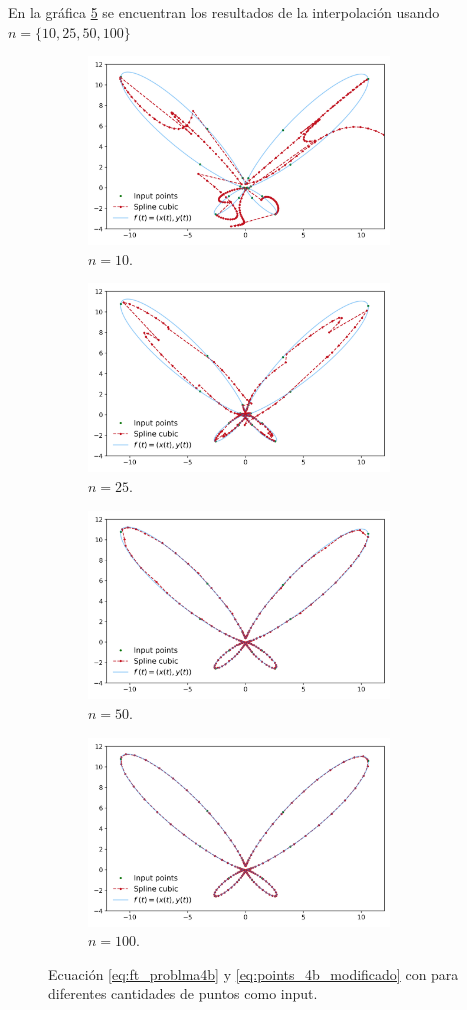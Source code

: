 En la gráfica \ref{fig:problem4b} se encuentran los resultados de  la interpolación usando $n=\{10,25,50,100\}$
\begin{figure}[H]
	\centering
	\begin{subfigure}[b]{8cm}
		\includegraphics[width=8cm]{Graphics/problema04b_10.png}
		\caption{$n=10$.}
		\label{fig:problem4b10}
	\end{subfigure}
	\begin{subfigure}[b]{8cm}
		\includegraphics[width=8cm]{Graphics/problema04b_25.png}
		\caption{$n=25$.}
		\label{fig:problem4b25}
	\end{subfigure}
	\begin{subfigure}[b]{8cm}
		\includegraphics[width=8cm]{Graphics/problema04b_50.png}
		\caption{$n=50$.}
		\label{fig:problem4b50}
	\end{subfigure}
	\begin{subfigure}[b]{8cm}
		\includegraphics[width=8cm]{Graphics/problema04b_100.png}
		\caption{$n=100$.}
		\label{fig:problem4b100}
	\end{subfigure}
	\caption{Ecuación \ref{eq:ft_problma4b} y  \ref{eq:points_4b_modificado} con para diferentes cantidades de puntos como input.}
	\label{fig:problem4b}
\end{figure}

